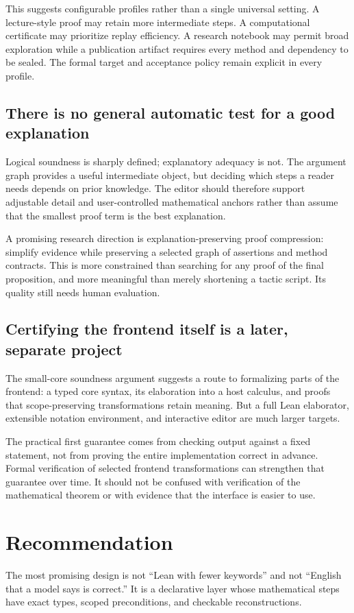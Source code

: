 \documentclass[11pt,a4paper]{article}
\theoremstyle{remark}
\begin{document}
This suggests configurable profiles rather than a single universal setting. A lecture-style proof may retain more intermediate steps. A computational certificate may prioritize replay efficiency. A research notebook may permit broad exploration while a publication artifact requires every method and dependency to be sealed. The formal target and acceptance policy remain explicit in every profile.

\subsection{There is no general automatic test for a good explanation}
Logical soundness is sharply defined; explanatory adequacy is not. The argument graph provides a useful intermediate object, but deciding which steps a reader needs depends on prior knowledge. The editor should therefore support adjustable detail and user-controlled mathematical anchors rather than assume that the smallest proof term is the best explanation.

A promising research direction is explanation-preserving proof compression: simplify evidence while preserving a selected graph of assertions and method contracts. This is more constrained than searching for any proof of the final proposition, and more meaningful than merely shortening a tactic script. Its quality still needs human evaluation.

\subsection{Certifying the frontend itself is a later, separate project}
The small-core soundness argument suggests a route to formalizing parts of the frontend: a typed core syntax, its elaboration into a host calculus, and proofs that scope-preserving transformations retain meaning. But a full Lean elaborator, extensible notation environment, and interactive editor are much larger targets.

The practical first guarantee comes from checking output against a fixed statement, not from proving the entire implementation correct in advance. Formal verification of selected frontend transformations can strengthen that guarantee over time. It should not be confused with verification of the mathematical theorem or with evidence that the interface is easier to use.

\section{Recommendation}\label{sec:conclusion}
The most promising design is not ``Lean with fewer keywords'' and not ``English that a model says is correct.'' It is a declarative layer whose mathematical steps have exact types, scoped preconditions, and checkable reconstructions.
\end{document}
